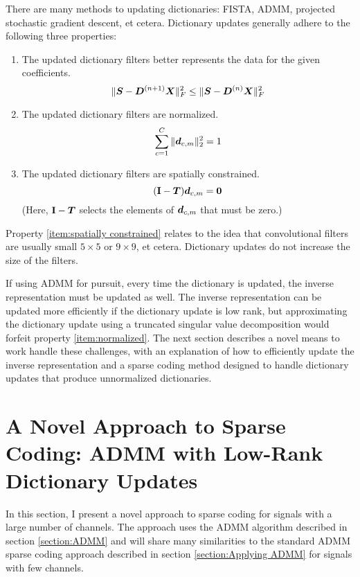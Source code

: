 There are many methods to updating dictionaries: FISTA, ADMM, projected stochastic gradient descent, et cetera. Dictionary updates generally adhere to the following three properties:
\begin{enumerate}
\item The updated dictionary filters better represents the data for the given coefficients.\label{item:improvement property}
\begin{equation}
\|\bm{S} - \bm{D}^{(n + 1)}\bm{X}\|_F^2 \leq \|\bm{S} - \bm{D}^{(n)}\bm{X}\|_F^2
\end{equation}
\item The updated dictionary filters are normalized.\label{item:normalized}
\begin{equation}
\sum_{c = 1}^C \|\bm{d}_{c,m}\|_2^2 = 1
\end{equation}
\item The updated dictionary filters are spatially constrained. \label{item:spatially constrained}
\begin{equation}
({\bf I} - \bm{T})\bm{d}_{c,m} = \bm{0}
\end{equation}
(Here, ${\bf I} - \bm{T}$ selects the elements of $\bm{d}_{c,m}$ that must be zero.)
\end{enumerate}
Property \ref{item:spatially constrained} relates to the idea that convolutional filters are usually small $5 \times 5$ or $9 \times 9$, et cetera. Dictionary updates do not increase the size of the filters.

If using ADMM for pursuit, every time the dictionary is updated, the inverse representation must be updated as well. The inverse representation can be updated more efficiently if the dictionary update is low rank, but approximating the dictionary update using a truncated singular value decomposition would forfeit property \ref{item:normalized}. The next section describes a novel means to work handle these challenges, with an explanation of how to efficiently update the inverse representation and a sparse coding method designed to handle dictionary updates that produce unnormalized dictionaries.

\section{A Novel Approach to Sparse Coding: ADMM with Low-Rank Dictionary Updates}
In this section, I present a novel approach to sparse coding for signals with a large number of channels. The approach uses the ADMM algorithm described in section \ref{section:ADMM} and will share many similarities to the standard ADMM sparse coding approach described in section \ref{section:Applying ADMM} for signals with few channels.

